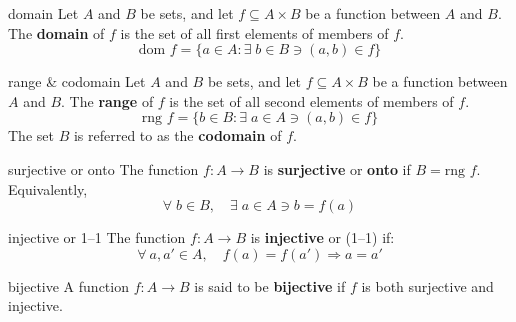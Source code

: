 \documentclass[avery5371,grid]{flashcards}
\begin{document}
\begin{flashcard}[Definition]{domain}
Let $A$ and $B$ be sets, and let $f \subseteq A \times B$ be a function
between $A$ and $B$.  The \textbf{domain} of $f$ is the set of all first
elements of members of $f$.
\begin{equation*}
\textrm{dom } f = \{ a \in A : \exists \; b \in B \ni (a,b) \in f \}
\end{equation*}
\end{flashcard}

\begin{flashcard}[Definition]{range \& codomain}
Let $A$ and $B$ be sets, and let $f \subseteq A \times B$ be a function
between $A$ and $B$.  The \textbf{range} of $f$ is the set of all second
elements of members of $f$.
\begin{equation*}
\textrm{rng } f = \{ b \in B : \exists \; a \in A \ni (a,b) \in f \}
\end{equation*}
The set $B$ is referred to as the \mbox{\textbf{codomain}} of $f$.
\end{flashcard}

\begin{flashcard}[Definition]{surjective or onto}
The function $f:A \rightarrow B$ is \textbf{surjective} or \textbf{onto}
if $B = \textrm{rng } f$.  Equivalently,
\begin{equation*}
\forall \; b \in B, \quad \exists \; a \in A \ni b = f(a)
\end{equation*}
\end{flashcard}

\begin{flashcard}[Definition]{injective or 1--1}
The function $f:A \rightarrow B$ is \textbf{injective} or \mbox{(1--1)}
if:
\begin{equation*}
\forall \ a, a' \in A, \quad f(a) = f(a') \Longrightarrow a = a'
\end{equation*}
\end{flashcard}

\begin{flashcard}[Definition]{bijective}
A function $f:A \rightarrow B$ is said to be \textbf{bijective}
if $f$ is both surjective and injective.
\end{flashcard}
\end{document}
